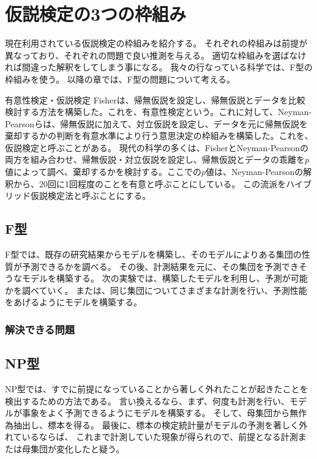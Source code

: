 
\chapter{仮説検定の3つの枠組み}
現在利用されている仮説検定の枠組みを紹介する。
それぞれの枠組みは前提が異なっており、それぞれの問題で良い推測を与える。
適切な枠組みを選ばなければ間違った解釈をしてしまう事になる。
我々の行なっている科学では、F型の枠組みを使う。
以降の章では、F型の問題について考える。



\begin{SMbox}{有意性検定・仮説検定}
    Fisherは、帰無仮説を設定し、帰無仮説とデータを比較検討する方法を構築した。これを、有意性検定という。これに対して、Neyman-Pearsonらは、帰無仮説に加えて、対立仮説を設定し、データを元に帰無仮説を棄却するかの判断を有意水準により行う意思決定の枠組みを構築した。これを、仮説検定と呼ぶことがある\cite{1573106361610039296}。
    現代の科学の多くは、FisherとNeyman-Pearsonの両方を組み合わせ、帰無仮説・対立仮説を設定し、帰無仮説とデータの乖離を$p$値によって調べ、棄却するかを検討する。ここでの$p$値は、Neyman-Pearsonの解釈から、20回に1回程度のことを有意と呼ぶことにしている。
    この流派をハイブリッド仮説検定法\cite{published_papers/18436201}と呼ぶことにする。
\end{SMbox}



\section{F型}
F型では、既存の研究結果からモデルを構築し、そのモデルによりある集団の性質が予測できるかを調べる。
その後、計測結果を元に、その集団を予測できそうなモデルを構築する。
次の実験では、構築したモデルを利用し、予測が可能かを調べていく。
または、同じ集団についてさまざまな計測を行い、予測性能をあげるようにモデルを構築する。

\subsection{解決できる問題} 




\section{NP型}
NP型では、すでに前提になっていることから著しく外れたことが起きたことを検出するための方法である。
言い換えるなら、まず、何度も計測を行い、モデルが事象をよく予測できるようにモデルを構築する。
そして、母集団から無作為抽出し、標本を得る。
最後に、標本の検定統計量がモデルの予測を著しく外れているならば、
これまで計測していた現象が得られので、前提となる計測または母集団が変化したと疑う。

